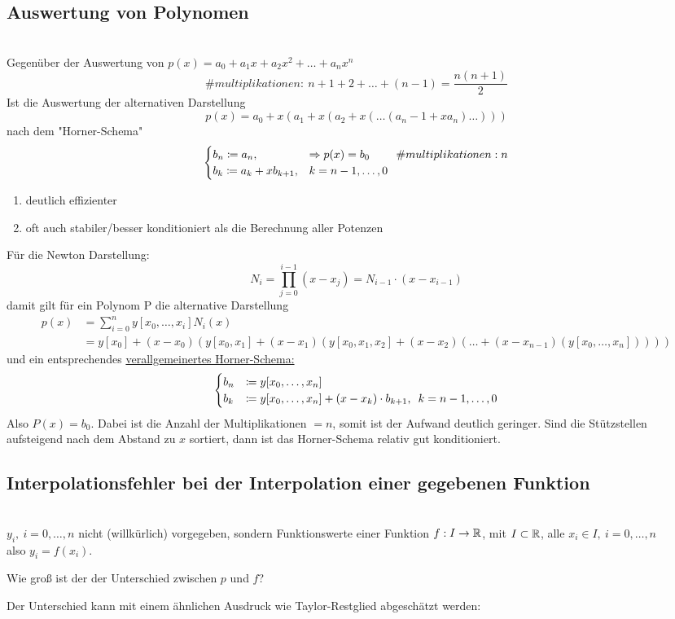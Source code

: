 \subsection{Auswertung von Polynomen}\hfill\\
Gegenüber der Auswertung von $p(x)=a_0+a_1x+a_2x^2+\dots + a_nx^n$
\[\# multiplikationen:\ n+1+2+\dots + (n-1)=\frac{n(n+1)}{2} \]
Ist die Auswertung der alternativen Darstellung \[p(x)=a_0+x(a_1+x(a_2+x(\dots (a_n-1+xa_n)\dots ))) \]
nach dem "Horner-Schema"\[\begin{cases}
        b_n\coloneqq a_n,& \Rightarrow p(x)=b_0\  \largespace\largespace\# multiplikationen: n\\
    b_k\coloneqq a_k+xb_{k+1},&k=n-1,\dots,0
\end{cases}\]
\begin{enumerate}
    \item deutlich effizienter
    \item oft auch stabiler/besser konditioniert als die Berechnung aller Potenzen
\end{enumerate}
Für die Newton Darstellung: \[
    N_i = \prod_{j=0}^{i-1}(x-x_j) = N_{i-1}\cdot(x-x_{i-1})\]
damit gilt für ein Polynom P die alternative Darstellung\begin{align*}
    p(x) &= \sum_{i=0}^n y[x_0,\dots, x_i]N_i(x) \\
         &= y[x_0] + (x-x_0)(y[x_0, x_1] + (x-x_1)(y[x_0,x_1,x_2]+(x-x_2)(\dots + (x-x_{n-1})(y[x_0,\dots,x_n]))))
\end{align*}
und ein entsprechendes \underline{verallgemeinertes Horner-Schema:} \[
    \begin{cases}
        b_n &\coloneqq y[x_0, \dots, x_n]\\
        b_k &\coloneqq y[x_0, \dots, x_n] + (x-x_k)\cdot b_{k+1}, \hspace{.5em} k=n-1,\dots,0
    \end{cases}\]
Also $P(x)=b_0$. Dabei ist die Anzahl der Multiplikationen $=n$, somit ist der Aufwand deutlich geringer.
Sind die Stützstellen aufsteigend nach dem Abstand zu $x$ sortiert, dann ist das 
Horner-Schema relativ gut konditioniert.


\subsection{Interpolationsfehler bei der Interpolation einer gegebenen Funktion}\hfill\\
$y_i, \ i=0,\dots,n $ nicht  (willkürlich) vorgegeben, sondern Funktionswerte einer Funktion $f:I\to\mathbb{R}$, mit $I\subset\mathbb{R}$, 
alle $x_i\in I,\ i=0,\dots,n$\\
also $y_i=f(x_i)$. 
\begin{question} Wie groß ist der der Unterschied zwischen $p$ und $f$?\\
\end{question}
Der Unterschied kann mit einem ähnlichen Ausdruck wie Taylor-Restglied abgeschätzt werden:\\

